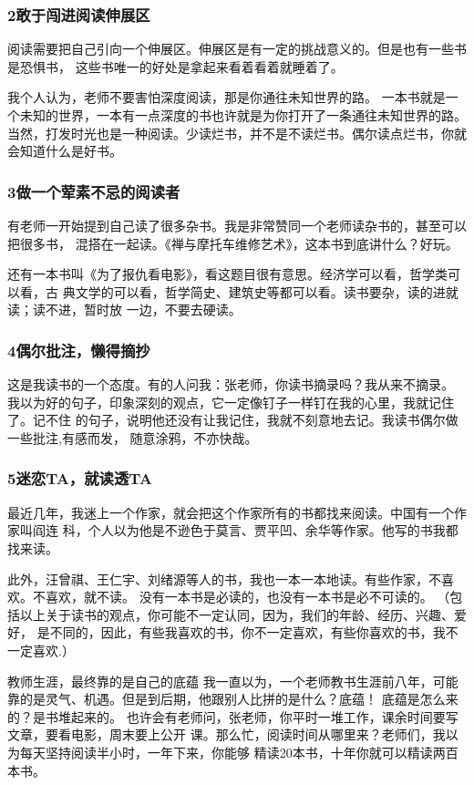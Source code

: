 \documentclass[11pt]{ctexart}
\begin{document}
{{{{\subsubsection{2敢于闯进阅读伸展区}
\label{sec:orgab79bb2}
阅读需要把自己引向一个伸展区。伸展区是有一定的挑战意义的。但是也有一些书是恐惧书，
这些书唯一的好处是拿起来看着看着就睡着了。

我个人认为，老师不要害怕深度阅读，那是你通往未知世界的路。
一本书就是一个未知的世界，一本有一点深度的书也许就是为你打开了一条通往未知世界的路。
当然，打发时光也是一种阅读。少读烂书，并不是不读烂书。偶尔读点烂书，你就会知道什么是好书。
\subsubsection{3做一个荤素不忌的阅读者}
\label{sec:org3a4f0b0}
有老师一开始提到自己读了很多杂书。我是非常赞同一个老师读杂书的，甚至可以把很多书，
混搭在一起读。《禅与摩托车维修艺术》，这本书到底讲什么？好玩。

还有一本书叫《为了报仇看电影》，看这题目很有意思。经济学可以看，哲学类可以看，古
典文学的可以看，哲学简史、建筑史等都可以看。读书要杂，读的进就读；读不进，暂时放
一边，不要去硬读。

\subsubsection{4偶尔批注，懒得摘抄}
\label{sec:orgec71bde}
这是我读书的一个态度。有的人问我：张老师，你读书摘录吗？我从来不摘录。
我以为好的句子，印象深刻的观点，它一定像钉子一样钉在我的心里，我就记住了。记不住
的句子，说明他还没有让我记住，我就不刻意地去记。我读书偶尔做一些批注,有感而发，
随意涂鸦，不亦快哉。

\subsubsection{5迷恋TA，就读透TA}
\label{sec:org3e80c58}
最近几年，我迷上一个作家，就会把这个作家所有的书都找来阅读。中国有一个作家叫阎连
科，个人以为他是不逊色于莫言、贾平凹、余华等作家。他写的书我都找来读。

此外，汪曾祺、王仁宇、刘绪源等人的书，我也一本一本地读。有些作家，不喜欢。不喜欢，就不读。
没有一本书是必读的，也没有一本书是必不可读的。
（包括以上关于读书的观点，你可能不一定认同，因为，我们的年龄、经历、兴趣、爱好，
是不同的，因此，有些我喜欢的书，你不一定喜欢，有些你喜欢的书，我不一定喜欢.）

教师生涯，最终靠的是自己的底蕴
我一直以为，一个老师教书生涯前八年，可能靠的是灵气、机遇。但是到后期，他跟别人比拼的是什么？底蕴！
底蕴是怎么来的？是书堆起来的。
也许会有老师问，张老师，你平时一堆工作，课余时间要写文章，要看电影，周末要上公开
课。那么忙，阅读时间从哪里来？老师们，我以为每天坚持阅读半小时，一年下来，你能够
精读20本书，十年你就可以精读两百本书。

}}}}
\end{document}
